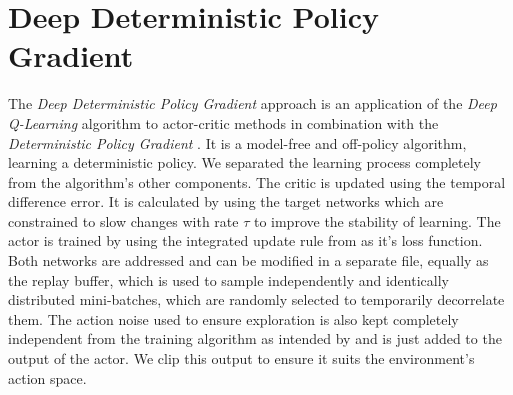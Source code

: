 \section{Deep Deterministic Policy Gradient}
\label{sec:ddpg}
The \textit{Deep Deterministic Policy Gradient} approach 
\citep{lillicrap2015continuous} is an application of the \textit{Deep 
Q-Learning} algorithm \citep{mnih2013playing} to actor-critic methods 
\citep{konda2000actor} in combination with the \textit{Deterministic Policy 
Gradient} \citep{silver2014deterministic}. It is a model-free and off-policy 
algorithm, learning a deterministic policy. We separated the learning process 
completely from the algorithm's other components. The critic is updated using 
the temporal difference error. It is calculated by using the target networks 
which are constrained to slow changes with rate $\tau$ to improve the stability 
of learning. The actor is trained by using the integrated update rule from 
\cite{lillicrap2015continuous} as it's loss function. Both networks are 
addressed and can be modified in a separate file, equally as the replay buffer, 
which is used to sample independently and identically distributed mini-batches, which are
randomly selected to temporarily decorrelate them. The action noise used to ensure 
exploration is also kept completely independent from the training algorithm as 
intended by \citep{lillicrap2015continuous} and is just added to the output of 
the actor. We clip this output to ensure it suits the environment's action space.

